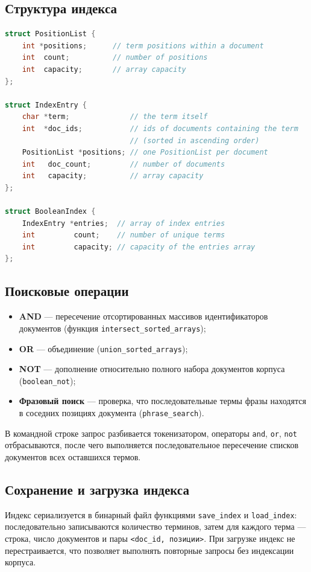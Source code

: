 \subsection{Структура индекса}
\begin{lstlisting}[language=C++]
struct PositionList {
    int *positions;      // term positions within a document
    int  count;          // number of positions
    int  capacity;       // array capacity
};

struct IndexEntry {
    char *term;              // the term itself
    int  *doc_ids;           // ids of documents containing the term
                             // (sorted in ascending order)
    PositionList *positions; // one PositionList per document
    int   doc_count;         // number of documents
    int   capacity;          // array capacity
};

struct BooleanIndex {
    IndexEntry *entries;  // array of index entries
    int         count;    // number of unique terms
    int         capacity; // capacity of the entries array
};
\end{lstlisting}

\subsection{Поисковые операции}
\begin{itemize}
    \item \textbf{AND} --- пересечение отсортированных массивов идентификаторов документов (функция \texttt{intersect\_sorted\_arrays});
    \item \textbf{OR} --- объединение (\texttt{union\_sorted\_arrays});
    \item \textbf{NOT} --- дополнение относительно полного набора документов корпуса (\texttt{boolean\_not});
    \item \textbf{Фразовый поиск} --- проверка, что последовательные термы фразы находятся в соседних позициях документа (\texttt{phrase\_search}).
\end{itemize}

В командной строке запрос разбивается токенизатором, операторы
\texttt{and}, \texttt{or}, \texttt{not} отбрасываются, после чего выполняется
последовательное пересечение списков документов всех оставшихся термов.

\subsection{Сохранение и загрузка индекса}
Индекс сериализуется в бинарный файл функциями \texttt{save\_index} и
\texttt{load\_index}: последовательно записываются количество терминов, затем
для каждого терма --- строка, число документов и пары
\texttt{<doc\_id, позиции>}. При загрузке индекс не перестраивается, что
позволяет выполнять повторные запросы без индексации корпуса.

